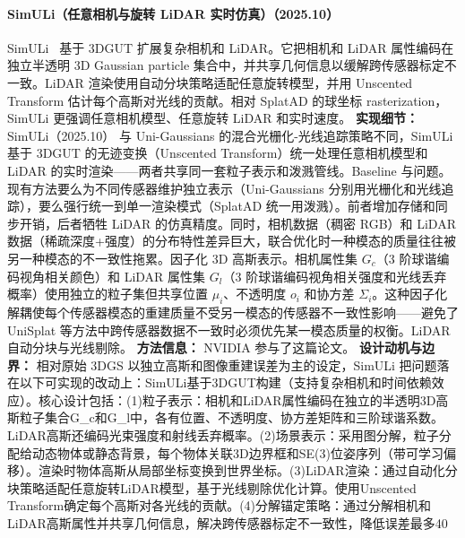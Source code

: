 \paragraph{SimULi（任意相机与旋转 LiDAR 实时仿真）（2025.10）}
SimULi~\cite{2510_12901} 基于 3DGUT 扩展复杂相机和 LiDAR。它把相机和 LiDAR 属性编码在独立半透明 3D Gaussian particle 集合中，并共享几何信息以缓解跨传感器标定不一致。LiDAR 渲染使用自动分块策略适配任意旋转模型，并用 Unscented Transform 估计每个高斯对光线的贡献。相对 SplatAD 的球坐标 rasterization，SimULi 更强调任意相机模型、任意旋转 LiDAR 和实时速度。
\textbf{实现细节：} SimULi（2025.10） 与 Uni-Gaussians 的混合光栅化-光线追踪策略不同，SimULi 基于 3DGUT 的无迹变换（Unscented Transform）统一处理任意相机模型和 LiDAR 的实时渲染——两者共享同一套粒子表示和泼溅管线。Baseline 与问题。现有方法要么为不同传感器维护独立表示（Uni-Gaussians 分别用光栅化和光线追踪），要么强行统一到单一渲染模式（SplatAD 统一用泼溅）。前者增加存储和同步开销，后者牺牲 LiDAR 的仿真精度。同时，相机数据（稠密 RGB）和 LiDAR 数据（稀疏深度+强度）的分布特性差异巨大，联合优化时一种模态的质量往往被另一种模态的不一致性拖累。因子化 3D 高斯表示。相机属性集 $G_c$（3 阶球谐编码视角相关颜色）和 LiDAR 属性集 $G_l$（3 阶球谐编码视角相关强度和光线丢弃概率）使用独立的粒子集但共享位置 $\mu_i$、不透明度 $o_i$ 和协方差 $\Sigma_i$。这种因子化解耦使每个传感器模态的重建质量不受另一模态的传感器不一致性影响——避免了 UniSplat 等方法中跨传感器数据不一致时必须优先某一模态质量的权衡。LiDAR 自动分块与光线剔除。
\textbf{方法信息：} NVIDIA 参与了这篇论文。
\textbf{设计动机与边界：} 相对原始 3DGS 以独立高斯和图像重建误差为主的设定，SimULi 把问题落在以下可实现的改动上：SimULi基于3DGUT构建（支持复杂相机和时间依赖效应）。核心设计包括：(1)粒子表示：相机和LiDAR属性编码在独立的半透明3D高斯粒子集合G\_c和G\_l中，各有位置、不透明度、协方差矩阵和三阶球谐系数。LiDAR高斯还编码光束强度和射线丢弃概率。(2)场景表示：采用图分解，粒子分配给动态物体或静态背景，每个物体关联3D边界框和SE(3)位姿序列（带可学习偏移）。渲染时物体高斯从局部坐标变换到世界坐标。(3)LiDAR渲染：通过自动化分块策略适配任意旋转LiDAR模型，基于光线剔除优化计算。使用Unscented Transform确定每个高斯对各光线的贡献。(4)分解锚定策略：通过分解相机和LiDAR高斯属性并共享几何信息，解决跨传感器标定不一致性，降低误差最多40%
